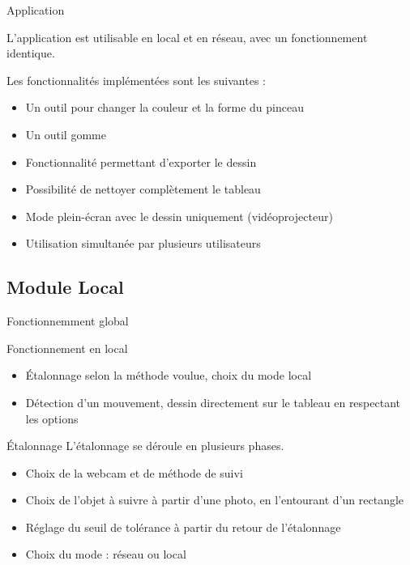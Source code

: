 \documentclass{beamer}
\begin{document}
		\begin{frame}{Application}
			
			L'application est utilisable en local et en réseau, avec un fonctionnement identique.
			
			Les fonctionnalités implémentées sont les suivantes :
			\begin{itemize}
			\item Un outil pour changer la couleur et la forme du pinceau
			\item Un outil gomme
			\item Fonctionnalité permettant d'exporter le dessin
			\item Possibilité de nettoyer complètement le tableau
			\item Mode plein-écran avec le dessin uniquement (vidéoprojecteur)
			\item Utilisation simultanée par plusieurs utilisateurs
			\end{itemize}
		\end{frame}
		
	\subsection{Module Local}
		\begin{frame}{Fonctionnemment global}
			\begin{block}{Fonctionnement en local}
				\begin{itemize}
				\item Étalonnage selon la méthode voulue, choix du mode local
				\item Détection d'un mouvement, dessin directement sur le tableau en respectant les options
				\end{itemize}
			\end{block}
		\end{frame}
		
		\begin{frame}{Étalonnage}
			L'étalonnage se déroule en plusieurs phases.
			\begin{itemize}
			\item Choix de la webcam et de méthode de suivi
			\item Choix de l'objet à suivre à partir d'une photo, en l'entourant d'un rectangle
			\item Réglage du seuil de tolérance à partir du retour de l'étalonnage
			\item Choix du mode : réseau ou local
			\end{itemize}
		\end{frame}
		
\end{document}
